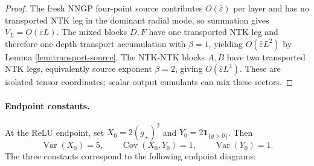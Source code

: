 \documentclass{article}
\newcommand{\Cov}{\operatorname{Cov}}
\newcommand{\Var}{\operatorname{Var}}
\newcommand{\barE}{\bar\varepsilon}
\newcommand{\one}{\mathbf 1}
\begin{document}
\begin{proof}
The fresh NNGP four-point source contributes \(O(\barE)\) per layer and has no transported NTK leg in the dominant radial mode, so summation gives \(V_L=O(\barE L)\). The mixed blocks \(D,F\) have one transported NTK leg and therefore one depth-transport accumulation with \(\beta=1\), yielding \(O(\barE L^2)\) by Lemma \ref{lem:transport-source}. The NTK-NTK blocks \(A,B\) have two transported NTK legs, equivalently source exponent \(\beta=2\), giving \(O(\barE L^3)\). These are isolated tensor coordinates; scalar-output cumulants can mix these sectors.
\end{proof}

\paragraph{Endpoint constants.}
At the ReLU endpoint, set \(X_0=2(g_+)^2\) and \(Y_0=2\one_{\{g>0\}}\). Then
\begin{equation}
\Var(X_0)=5,
\qquad
\Cov(X_0,Y_0)=1,
\qquad
\Var(Y_0)=1.
\end{equation}
The three constants correspond to the following endpoint diagrams:
\end{document}
